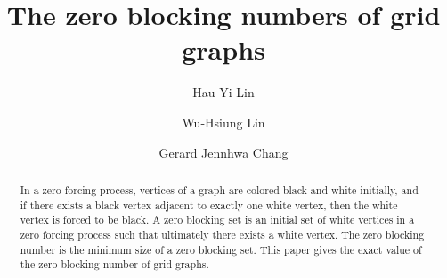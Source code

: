 \documentclass[preprint,12pt]{elsarticle}
\begin{document}
\begin{frontmatter}


\title{The zero blocking numbers of grid graphs}%
\author{Hau-Yi Lin}
\author{Wu-Hsiung Lin}
\author{Gerard Jennhwa Chang}
\address[nycu]{Department of Applied Mathematics, National Yang Ming Chiao Tung University, Hsinchu 30010, Taiwan}
\address[ntu]{Department of Mathematics, National Taiwan University, Taipei 10617, Taiwan}








\begin{abstract}
In a zero forcing process,
vertices of a graph are colored black and white initially,
and if there exists a black vertex adjacent to exactly one white vertex,
then the white vertex is forced to be black.
A zero blocking set is an initial set of white vertices
in a zero forcing process such that ultimately there exists a white vertex.
The zero blocking number is the minimum size of a zero blocking set.
This paper gives the exact value of the zero blocking number of grid graphs.
\end{abstract}


\end{frontmatter}
\end{document}
